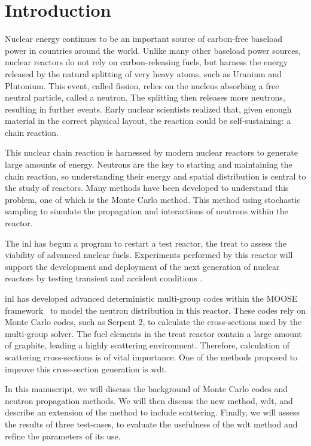 
\chapter{Introduction}
\label{chap:intro}

Nuclear energy continues to be an important source of carbon-free
baseload power in countries around the world. Unlike many other
baseload power sources, nuclear reactors do not rely on
carbon-releasing fuels, but harness the energy released by the
natural splitting of very heavy atoms, such as Uranium and
Plutonium. This event, called fission, relies on the nucleus absorbing
a free neutral particle, called a neutron. The splitting then releases
more neutrons, resulting in further events. Early nuclear scientists
realized that, given enough material in the correct physical layout,
the reaction could be self-sustaining: a chain reaction.

This nuclear chain reaction is harnessed by modern nuclear reactors
to generate large amounts of energy. Neutrons are the key to starting
and maintaining the chain reaction, so understanding their energy and
spatial distribution is central to the study of reactors. Many methods
have been developed to understand this problem, one of which is the
Monte Carlo method. This method using stochastic sampling to simulate
the propagation and interactions of neutrons within the reactor.

The \gls{inl} has begun a program to restart a test reactor, the
\gls{treat} to assess the viability of advanced nuclear
fuels. Experiments performed by this reactor will
support the development and deployment of the next generation of
nuclear reactors by testing transient and accident conditions \cite{webtreat}.

\gls{inl} has developed advanced deterministic multi-group codes
within the MOOSE framework~\cite{gaston2009} to model the neutron
distribution in this reactor. These codes rely on Monte Carlo codes,
such as Serpent 2, to calculate the cross-sections used by the
multi-group solver. The fuel elements in the \gls{treat} reactor
contain a large amount of graphite, leading a highly scattering
environment. Therefore, calculation of scattering cross-sections is of
vital importance. One of the methods proposed to improve this
cross-section generation is \gls{wdt}.

In this manuscript, we will discuss the background of Monte Carlo
codes and neutron propagation methods. We will then discuss the new
method, \gls{wdt}, and describe an extension of the method to include
scattering. Finally, we will assess the results of three test-cases,
to evaluate the usefulness of the \gls{wdt} method and refine the
parameters of its use.




